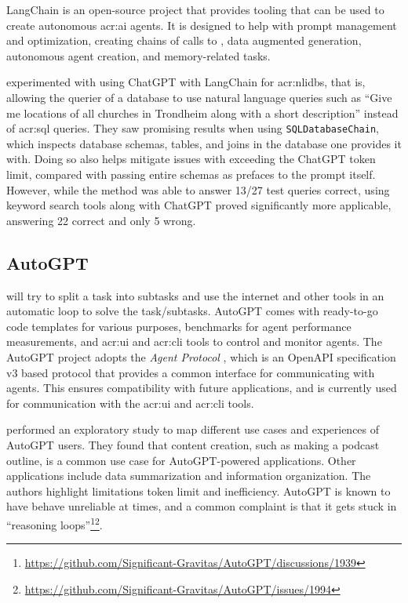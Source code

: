 LangChain \citep{chaseLangChain2022} is an open-source project that provides tooling that can be used to create autonomous \acrshort{acr:ai} agents. It is designed to help with prompt management and optimization, creating chains of calls to , data augmented generation, autonomous agent creation, and memory-related tasks.

\cite{nascimentoFamilyNaturalLanguage} experimented with using ChatGPT with LangChain for \glspl{acr:nlidb}, that is, allowing the querier of a database to use natural language queries such as \enquote{Give me locations of all churches in Trondheim along with a short description} instead of \acrshort{acr:sql} queries. They saw promising results when using \texttt{SQLDatabaseChain}, which inspects database schemas, tables, and joins in the database one provides it with. Doing so also helps mitigate issues with exceeding the ChatGPT token limit, compared with passing entire schemas as prefaces to the prompt itself. However, while the method was able to answer 13/27 test queries correct, using keyword search tools along with ChatGPT proved significantly more applicable, answering 22 correct and only 5 wrong.

\subsection{AutoGPT}\label{subsubsec:autogpt}

\cite{richardAutoGPTHeartOpensource2023} will try to split a task into subtasks and use the internet and other tools in an automatic loop to solve the task/subtasks. AutoGPT comes with ready-to-go code templates for various purposes, benchmarks for agent performance measurements, and \acrshort{acr:ui} and \acrshort{acr:cli} tools to control and monitor agents. The AutoGPT project adopts the  \textit{Agent Protocol} \cite{AgentProtocol}, which is an OpenAPI specification v3 based protocol that provides a common interface for communicating with agents. This ensures compatibility with future applications, and is currently used for communication with the \acrshort{acr:ui} and \acrshort{acr:cli} tools.

\cite{firatWhatIfGPT42023} performed an exploratory study to map different use cases and experiences of AutoGPT users. They found that content creation, such as making a podcast outline, is a common use case for AutoGPT-powered applications. Other applications include data summarization and information organization. The authors highlight limitations token limit and inefficiency. AutoGPT is known to have behave unreliable at times, and a common complaint is that it gets stuck in \enquote{reasoning loops}\footnote{\url{https://github.com/Significant-Gravitas/AutoGPT/discussions/1939}}\footnote{\url{https://github.com/Significant-Gravitas/AutoGPT/issues/1994}}.

